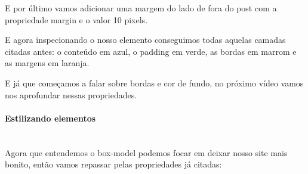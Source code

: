 \documentclass[12pt,a4paper]{article}
\begin{document}
	E por último vamos adicionar uma margem do lado de fora do post com a propriedade margin e o valor 10 pixels.
	
	E agora inspecionando o nosso elemento conseguimos todas aquelas camadas citadas antes: o conteúdo em azul, o padding em verde, as bordas em marrom e as margens em laranja.
	
	E já que começamos a falar sobre bordas e cor de fundo, no próximo vídeo vamos nos aprofundar nessas propriedades.
	
	\paragraph{Estilizando elementos} \mbox{} \\
	
	Agora que entendemos o box-model podemos focar em deixar nosso site mais bonito, então vamos repassar pelas propriedades já citadas:
	
\end{document}
